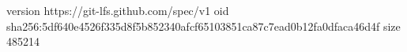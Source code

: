 version https://git-lfs.github.com/spec/v1
oid sha256:5df640e4526f335d8f5b852340afcf65103851ca87c7ead0b12fa0dfaca46d4f
size 485214
